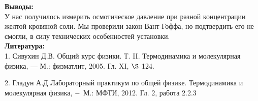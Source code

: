 \documentclass[a4paper, 12pt]{article}%
\begin{document}
	\textbf{Выводы: }\\
	
	
	У нас получилось измерить осмотическое давление при разной концентрации желтой кровяной соли. Мы проверили закон Вант-Гоффа, но подтвердить его не смогли, в силу технических особенностей установки.\\
	
	\textbf{Литература: }\\
	
1. Сивухин Д.В. Общий курс физики. Т. II. Термодинамика и молекулярная
физика, — М.: физматлит, 2005. Гл. XI, $\S$ 124.
	
	2. Гладун А.Д Лабораторный практикум по общей физике. Термодинамика и молекулярная физика, $\--$ М.: МФТИ, 2012. Гл. 2, работа 2.2.3 
	
\end{document}
